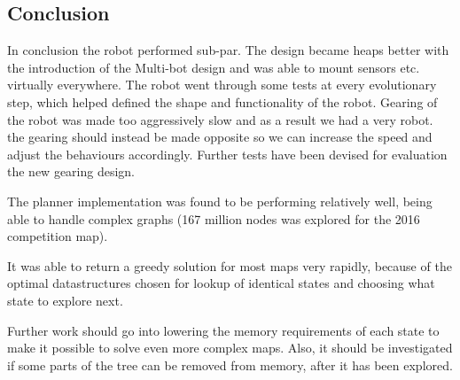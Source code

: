\begin{multicols}{2}
\section{Conclusion}
In conclusion the robot performed sub-par. The design became heaps better with the introduction of the Multi-bot design and was able to mount sensors etc. virtually everywhere. The robot went through some tests at every evolutionary step, which helped defined the shape and functionality of the robot. Gearing of the robot was made too aggressively slow and as a result we had a very robot. the gearing should instead be made opposite so we can increase the speed and adjust the behaviours accordingly. Further tests have been devised for evaluation the new gearing design. 



The planner implementation was found to be performing relatively well, being able to handle complex graphs (167 million nodes was explored for the 2016 competition map). 

It was able to return a greedy solution for most maps very rapidly, because of the optimal datastructures chosen for lookup of identical states and choosing what state to explore next. 

Further work should go into lowering the memory requirements of each state to make it possible to solve even more complex maps. Also, it should be investigated if some parts of the tree can be removed from memory, after it has been explored. 

\end{multicols}


